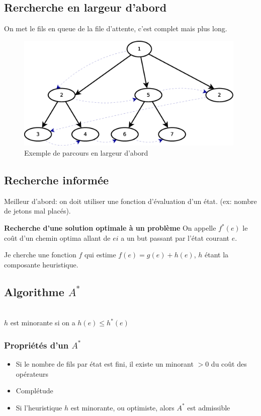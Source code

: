 \documentclass[12pt,a4paper,openany]{book}
\begin{document}
		\subsection{Rercherche en largeur d'abord}
		On met le fils en queue de la file d'attente, c'est complet mais plus long.
		\begin{figure}[H]
			\centering
			\includegraphics[width=11cm]{Diag2.eps}
			\caption{Exemple de parcours en largeur d'abord}
		\end{figure}

		\subsection{Recherche informée}
		Meilleur d'abord: on doit utiliser une fonction d'évaluation d'un état. (ex: nombre de jetons mal placés).

		\textbf{Recherche d'une solution optimale à un problème} On appelle $f^*(e)$ le coût d'un chemin optima allant de $ei$ a un but passant par l'état courant $e$.

		Je cherche une fonction $f$ qui estime $f(e)=g(e)+h(e)$, $h$ étant la composante heuristique.

		\subsection{Algorithme $A^*$}
		\begin{definition}~\\
			$h$ est minorante si on a $h(e) \leq h^*(e)$
		\end{definition}
		\subsubsection{Propriétés d'un $A^*$}
		\begin{itemize}
			\item Si le nombre de fils par état est fini, il existe un minorant $>0$ du coût des opérateurs
			\item Complétude
			\item Si l'heuristique $h$ est minorante, ou optimiste, alors $A^*$ est admissible
		\end{itemize}
\end{document}
